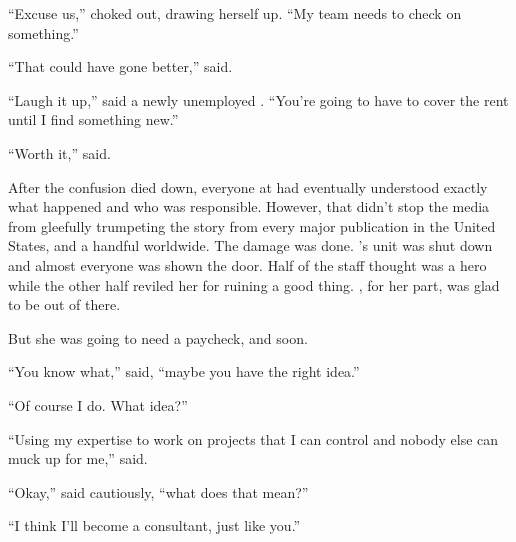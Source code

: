 ``Excuse us,'' \Boss{} choked out, drawing herself up. ``My team needs to check on something.''

\sectionBreak{}

``That could have gone better,'' {\sidetag} said.

``Laugh it up,'' said a newly unemployed {\protag}. ``You're going to have to cover the rent until I find something new.''

``Worth it,'' {\sidetag} said.

After the confusion died down, everyone at \energyCompany{} had eventually understood exactly what happened and who was responsible. However, that didn't stop the media from gleefully trumpeting the story from every major publication in the United States, and a handful worldwide. The damage was done. {\protag}'s unit was shut down and almost everyone was shown the door. Half of the staff thought {\protag} was a hero while the other half reviled her for ruining a good thing. {\protag}, for her part, was glad to be out of there.

But she was going to need a paycheck, and soon.

``You know what,'' {\protag} said, ``maybe you have the right idea.''

``Of course I do. What idea?''

``Using my expertise to work on projects that I can control and nobody else can muck up for me,'' {\protag} said.

``Okay,'' {\sidetag} said cautiously, ``what does that mean?''

``I think I'll become a consultant, just like you.''